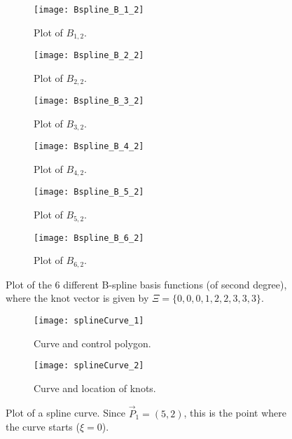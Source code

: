 \begin{figure}
        \begin{subfigure}{0.33\textwidth}
       		\centering
			\texttt{[image: Bspline\_B\_1\_2]}
            \caption{Plot of $B_{1,2}$.}
        \end{subfigure}%
        \hspace*{0.005\textwidth}%
        \begin{subfigure}{0.33\textwidth}
       		\centering
			\texttt{[image: Bspline\_B\_2\_2]}
            \caption{Plot of $B_{2,2}$.}
        \end{subfigure}%
        \hspace*{0.005\textwidth}%
        \begin{subfigure}{0.33\textwidth}
       		\centering
			\texttt{[image: Bspline\_B\_3\_2]}
            \caption{Plot of $B_{3,2}$.}
        \end{subfigure}
		\par\bigskip	
		\par\bigskip	
        \begin{subfigure}{0.33\textwidth}
       		\centering
			\texttt{[image: Bspline\_B\_4\_2]}
            \caption{Plot of $B_{4,2}$.}
        \end{subfigure}%
        \hspace*{0.005\textwidth}%
        \begin{subfigure}{0.33\textwidth}
       		\centering
			\texttt{[image: Bspline\_B\_5\_2]}
            \caption{Plot of $B_{5,2}$.}
        \end{subfigure}%
        \hspace*{0.005\textwidth}%
        \begin{subfigure}{0.33\textwidth}
       		\centering
			\texttt{[image: Bspline\_B\_6\_2]}
            \caption{Plot of $B_{6,2}$.}
        \end{subfigure}
        \caption[Plot of B-splines with $\check{p}=2$]{Plot of the 6 different B-spline basis functions (of second degree), where the knot vector is given by $\Xi = \{0, 0, 0, 1, 2, 2, 3, 3, 3\}$.}
        \label{Fig:Bsplines_p2}   
\end{figure}
\begin{figure}
        \centering      
        \begin{subfigure}{0.49\textwidth}
       		\centering
			\texttt{[image: splineCurve\_1]}
            \caption{Curve and control polygon.}
        \end{subfigure}%
        \hspace*{0.02\textwidth}%
        \begin{subfigure}{0.49\textwidth}
       		\centering
			\texttt{[image: splineCurve\_2]}
            \caption{Curve and location of knots.}
        \end{subfigure}
        \caption[Plot of a spline curve]{Plot of a spline curve. Since $\vec{P}_1=(5,2)$, this is the point where the curve starts ($\xi=0$).}\label{Fig:splineCurve}
\end{figure}
